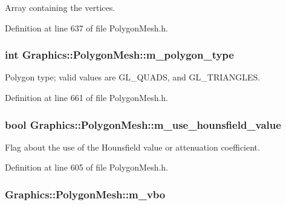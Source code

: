 Array containing the vertices. 



Definition at line 637 of file PolygonMesh.h.

\hypertarget{class_graphics_1_1_polygon_mesh_ac435c5305cb26572409a98779e66b0f2}{
\subsubsection[{m\_\-polygon\_\-type}]{\setlength{\rightskip}{0pt plus 5cm}int {\bf Graphics::PolygonMesh::m\_\-polygon\_\-type}}}
\label{class_graphics_1_1_polygon_mesh_ac435c5305cb26572409a98779e66b0f2}


Polygon type; valid values are GL\_\-QUADS, and GL\_\-TRIANGLES. 



Definition at line 661 of file PolygonMesh.h.

\hypertarget{class_graphics_1_1_polygon_mesh_a5c193c50619f85408f295c8c0a5e43a6}{
\subsubsection[{m\_\-use\_\-hounsfield\_\-value}]{\setlength{\rightskip}{0pt plus 5cm}bool {\bf Graphics::PolygonMesh::m\_\-use\_\-hounsfield\_\-value}}}
\label{class_graphics_1_1_polygon_mesh_a5c193c50619f85408f295c8c0a5e43a6}


Flag about the use of the Hounsfield value or attenuation coefficient. 



Definition at line 605 of file PolygonMesh.h.

\hypertarget{class_graphics_1_1_polygon_mesh_a181beb08c7c8b9a42666b948ed48f6da}{
\subsubsection[{m\_\-vbo}]{ {\bf Graphics::PolygonMesh::m\_\-vbo}}}
\label{class_graphics_1_1_polygon_mesh_a181beb08c7c8b9a42666b948ed48f6da}


